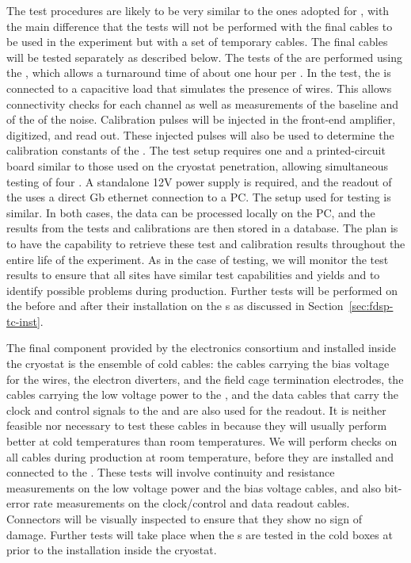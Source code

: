 The test procedures are likely to be
very similar to the ones adopted for , with the main
difference that the tests will not be performed with
the final cables to be used in the experiment but 
with a set of temporary cables. The final cables will be tested
separately as described below. The tests of the 
are performed using the , which allows a turnaround
time of about one hour per . In the
test, the  is connected to a capacitive load that
simulates the presence of  wires. This allows
connectivity checks for each channel as well as measurements of
the baseline and of the \rms of the noise. Calibration 
pulses will be injected in the front-end amplifier, digitized,
and read out. These injected pulses will also be used
to determine the calibration constants of the . 
The test setup requires one  and
a printed-circuit board similar to those used on the cryostat
penetration, allowing simultaneous testing of four .
A standalone 12V power supply is required, and the readout
of the  uses a direct Gb ethernet connection to
a PC. The setup used for  testing is similar.
In both cases, the data can be processed locally on the PC,
and the results from the tests and calibrations are then stored 
in a database. The plan is to have the capability to retrieve  
these test and calibration results throughout the entire life
of the experiment. As in the case of  testing,
we will monitor the test results to ensure that all
sites have similar test capabilities and yields and to
identify possible problems during production.
Further tests will be performed on the 
before and after their installation on the s as
discussed in Section~\ref{sec:fdsp-tc-inst}.

The final component provided by the  electronics consortium
and installed inside the cryostat is the ensemble of cold
cables: the cables carrying the bias voltage for the 
wires, the electron diverters, and the field cage termination electrodes,
the cables carrying the low voltage power to the ,
and the data cables that carry the clock and control signals
to the  and are also used for the readout. It is neither
feasible nor necessary to test these cables in \lntwo
because they will usually perform better at cold temperatures than 
room temperatures. We will perform checks on all cables 
during production at room temperature, before they are installed and 
connected to the . These tests will involve continuity
and resistance measurements on the low voltage power and the bias voltage
cables, and also bit-error rate measurements on the clock/control and 
data readout cables. Connectors will be visually inspected to
ensure that they show no sign of damage.  Further tests will take place
when the s are tested in the cold boxes at 
prior to the installation inside the cryostat.

